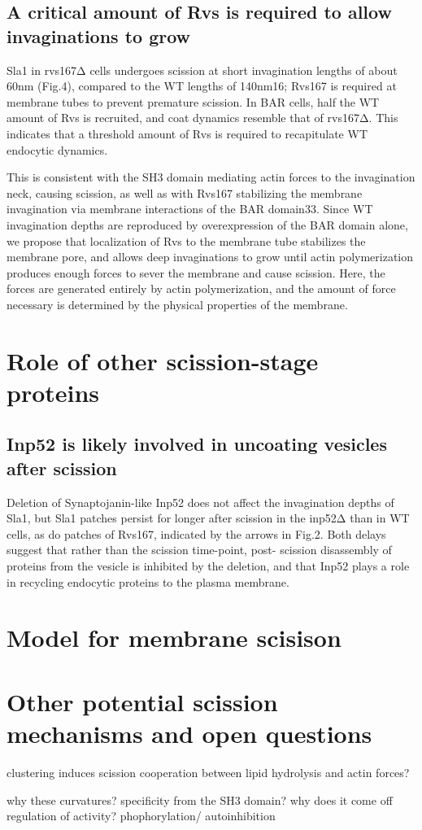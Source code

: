 \subsection{A critical amount of Rvs is required to allow invaginations to grow}

Sla1 in rvs167Δ cells undergoes scission at short invagination lengths of about 60nm (Fig.4), compared to the WT lengths of 140nm16; Rvs167 is required at membrane tubes to prevent premature scission. In BAR cells, half the WT amount of Rvs is recruited, and coat dynamics resemble that of rvs167Δ. This indicates that a threshold amount of Rvs is required to recapitulate WT endocytic dynamics. 

This is consistent with the SH3 domain mediating actin forces to the invagination neck, causing scission, as well as with Rvs167 stabilizing the membrane invagination via membrane interactions of the BAR domain33. Since WT invagination depths are reproduced by overexpression of the BAR domain alone, we propose that localization of Rvs to the membrane tube stabilizes the membrane pore, and allows deep invaginations to grow until actin polymerization produces enough forces to sever the membrane and cause scission. Here, the forces are generated entirely by actin polymerization, and the amount of force necessary is determined by the physical properties of the membrane.




\section{Role of other scission-stage proteins}
\subsection{Inp52 is likely involved in uncoating vesicles after scission}
Deletion of Synaptojanin-like Inp52 does not affect the invagination depths of Sla1, but Sla1 patches persist for longer after scission in the inp52Δ than in WT cells, as do patches of Rvs167, indicated by the arrows in Fig.2. Both delays suggest that rather than the scission time-point, post- scission disassembly of proteins from the vesicle is inhibited by the deletion, and that Inp52 plays a role in recycling endocytic proteins to the plasma membrane.


\section{Model for membrane scisison}


\section{Other potential scission mechanisms and open questions}

clustering induces scission 
cooperation between lipid hydrolysis and actin forces?


why these curvatures? specificity from the SH3 domain?
why does it come off
regulation of activity? phophorylation/ autoinhibition
